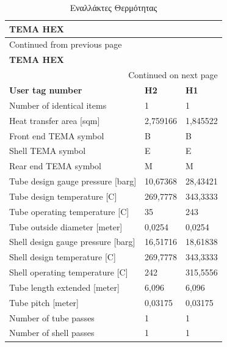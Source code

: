 \documentclass[11pt]{article}
\begin{document}
\begin{longtable}{lll}
\caption{Εναλλάκτες Θερμότητας}
\\
\textbf{TEMA HEX} &  & \\
\hline
\endfirsthead
\multicolumn{3}{l}{Continued from previous page} \\
\hline

\textbf{TEMA HEX} &  &  \\

\hline
\endhead
\hline\multicolumn{3}{r}{Continued on next page} \\
\endfoot
\endlastfoot
\hline
\textbf{User tag number} & \textbf{H2} & \textbf{H1}\\
Number of identical items & 1 & 1\\
Heat transfer area [sqm] & 2,759166 & 1,845522\\
Front end TEMA symbol & B & B\\
Shell TEMA symbol & E & E\\
Rear end TEMA symbol & M & M\\
Tube design gauge pressure [barg] & 10,67368 & 28,43421\\
Tube design temperature [C] & 269,7778 & 343,3333\\
Tube operating temperature [C] & 35 & 243\\
Tube outside diameter [meter] & 0,0254 & 0,0254\\
Shell design gauge pressure [barg] & 16,51716 & 18,61838\\
Shell design temperature [C] & 269,7778 & 343,3333\\
Shell operating temperature [C] & 242 & 315,5556\\
Tube length extended [meter] & 6,096 & 6,096\\
Tube pitch [meter] & 0,03175 & 0,03175\\
Number of tube passes & 1 & 1\\
Number of shell passes & 1 & 1\\
\end{longtable}
\end{document}
